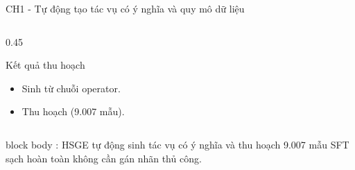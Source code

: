 \begin{frame}{CH1 - Tự động tạo tác vụ có ý nghĩa và quy mô dữ liệu}
\begin{columns}[t,onlytextwidth]
\begin{column}{0.45\textwidth}
      \vspace{-0.25cm}
      \begin{block}{Kết quả thu hoạch}
        \begin{itemize}\scriptsize\setlength{\itemsep}{0.5pt}
          \item Sinh  từ chuỗi operator.
          \item Thu hoạch  (9.007 mẫu).
        \end{itemize}
      \end{block}
    \end{column}
  \end{columns}

  \vspace{-0.05cm}
  \begin{beamercolorbox}[wd=\textwidth,sep=2.5pt,leftskip=6pt,rightskip=6pt,rounded=true]{block body}
    \scriptsize {}: HSGE tự động sinh tác vụ có ý nghĩa và thu hoạch 9.007 mẫu SFT sạch hoàn toàn không cần gán nhãn thủ công.
  \end{beamercolorbox}
\end{frame}

